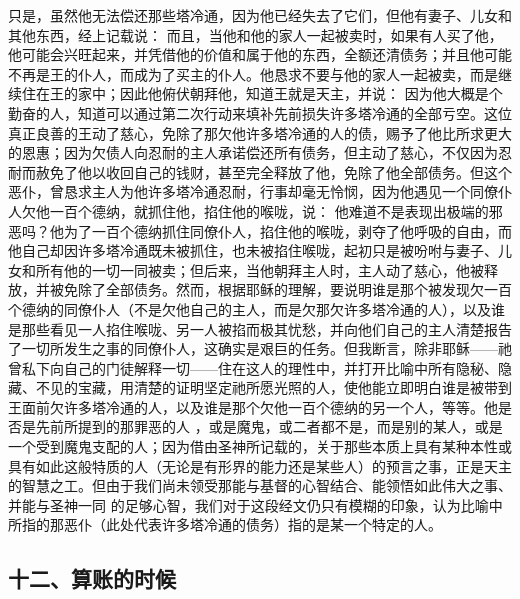 只是，虽然他无法偿还那些塔冷通，因为他已经失去了它们，但他有妻子、儿女和其他东西，经上记载说：  而且，当他和他的家人一起被卖时，如果有人买了他，他可能会兴旺起来，并凭借他的价值和属于他的东西，全额还清债务；并且他可能不再是王的仆人，而成为了买主的仆人。他恳求不要与他的家人一起被卖，而是继续住在王的家中；因此他俯伏朝拜他，知道王就是天主，并说：  因为他大概是个勤奋的人，知道可以通过第二次行动来填补先前损失许多塔冷通的全部亏空。这位真正良善的王动了慈心，免除了那欠他许多塔冷通的人的债，赐予了他比所求更大的恩惠；因为欠债人向忍耐的主人承诺偿还所有债务，但主动了慈心，不仅因为忍耐而赦免了他以收回自己的钱财，甚至完全释放了他，免除了他全部债务。但这个恶仆，曾恳求主人为他许多塔冷通忍耐，行事却毫无怜悯，因为他遇见一个同僚仆人欠他一百个德纳，就抓住他，掐住他的喉咙，说：  他难道不是表现出极端的邪恶吗？他为了一百个德纳抓住同僚仆人，掐住他的喉咙，剥夺了他呼吸的自由，而他自己却因许多塔冷通既未被抓住，也未被掐住喉咙，起初只是被吩咐与妻子、儿女和所有他的一切一同被卖；但后来，当他朝拜主人时，主人动了慈心，他被释放，并被免除了全部债务。然而，根据耶稣的理解，要说明谁是那个被发现欠一百个德纳的同僚仆人（不是欠他自己的主人，而是欠那欠许多塔冷通的人），以及谁是那些看见一人掐住喉咙、另一人被掐而极其忧愁，并向他们自己的主人清楚报告了一切所发生之事的同僚仆人，这确实是艰巨的任务。但我断言，除非耶稣——祂曾私下向自己的门徒解释一切——住在这人的理性中，并打开比喻中所有隐秘、隐藏、不见的宝藏，用清楚的证明坚定祂所愿光照的人，使他能立即明白谁是被带到王面前欠许多塔冷通的人，以及谁是那个欠他一百个德纳的另一个人，等等。他是否是先前所提到的那罪恶的人 ，或是魔鬼，或二者都不是，而是别的某人，或是一个受到魔鬼支配的人；因为借由圣神所记载的，关于那些本质上具有某种本性或具有如此这般特质的人（无论是有形界的能力还是某些人）的预言之事，正是天主的智慧之工。但由于我们尚未领受那能与基督的心智结合、能领悟如此伟大之事、并能与圣神一同   的足够心智，我们对于这段经文仍只有模糊的印象，认为比喻中所指的那恶仆（此处代表许多塔冷通的债务）指的是某一个特定的人。\par


\subsection{十二、算账的时候}

